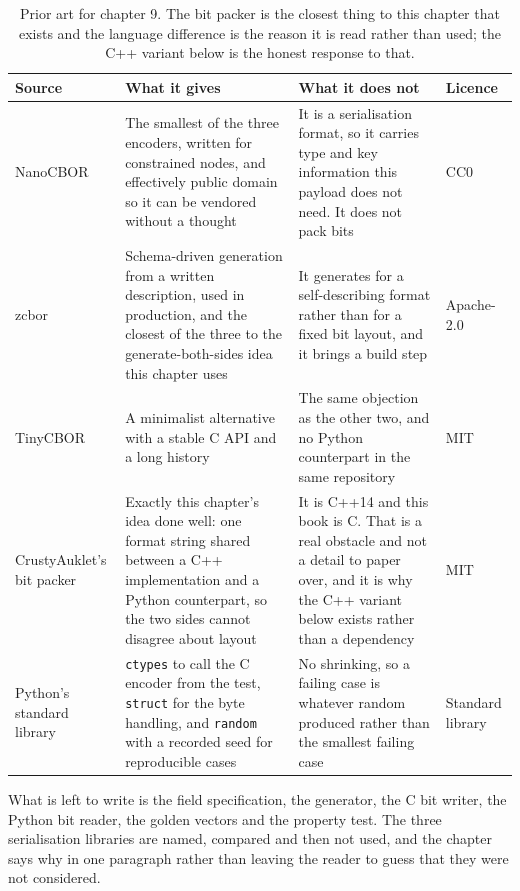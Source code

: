 \begin{table}[H]\centering\small
\begin{tabular}{p{32mm}p{46mm}p{40mm}p{20mm}}
\toprule
Source & What it gives & What it does not & Licence \\
\midrule
NanoCBOR & The smallest of the three encoders, written for constrained nodes, and effectively public domain so it can be vendored without a thought & It is a serialisation format, so it carries type and key information this payload does not need. It does not pack bits & CC0 \\
zcbor & Schema-driven generation from a written description, used in production, and the closest of the three to the generate-both-sides idea this chapter uses & It generates for a self-describing format rather than for a fixed bit layout, and it brings a build step & Apache-2.0 \\
TinyCBOR & A minimalist alternative with a stable C API and a long history & The same objection as the other two, and no Python counterpart in the same repository & MIT \\
CrustyAuklet's bit packer & Exactly this chapter's idea done well: one format string shared between a C++ implementation and a Python counterpart, so the two sides cannot disagree about layout & It is C++14 and this book is C. That is a real obstacle and not a detail to paper over, and it is why the C++ variant below exists rather than a dependency & MIT \\
Python's standard library & \texttt{ctypes} to call the C encoder from the test, \texttt{struct} for the byte handling, and \texttt{random} with a recorded seed for reproducible cases & No shrinking, so a failing case is whatever random produced rather than the smallest failing case & Standard library \\
\bottomrule
\end{tabular}
\caption{Prior art for chapter 9. The bit packer is the closest thing to this chapter that exists and the language difference is the reason it is read rather than used; the C++ variant below is the honest response to that.}
\end{table}

What is left to write is the field specification, the generator, the C bit
writer, the Python bit reader, the golden vectors and the property test. The
three serialisation libraries are named, compared and then not used, and the
chapter says why in one paragraph rather than leaving the reader to guess that
they were not considered.

